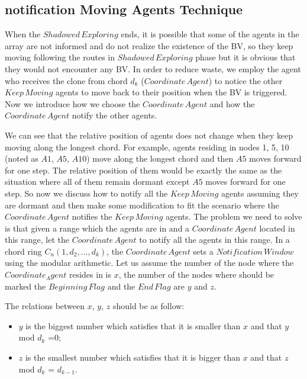 \subsection{notification Moving Agents Technique}


When the $Shadowed\,Exploring$ ends, it is possible that some of the agents in the array are not informed and do not realize the existence of the BV, so they keep moving following the routes in $Shadowed\,Exploring$  phase but it is obvious that they would not encounter any BV. In order to reduce waste, we employ the agent who receives the clone from chord $d_k$ ($Coordinate\,Agent$) to notice the other $Keep\,Moving$ agents to move back to their position when the BV is triggered. Now we introduce how we choose the $Coordinate\,Agent$ and how the $Coordinate\,Agent$ notify the other agents.



We can see that the relative position of agents does not change when they keep moving along the longest chord. For example, agents residing in nodes 1, 5, 10 (noted as $A1$, $A5$, $A10$) move along the longest chord and then $A5$ moves forward for one step. The relative position of them would be exactly the same as the situation where all of them remain dormant except $A5$ moves forward for one step. So now we discuss how to notify all the $Keep\,Moving$ agents assuming they are dormant and then make some modification to fit the scenario where the $Coordinate\,Agent$ notifies the $Keep\,Moving$ agents. The problem we need to solve is that given a range which the agents are in and a $Coordinate\,Agent$ located in this range, let the $Coordinate\,Agent$ to notify all the agents in this range. In a chord ring $C_n(1, d_2, \ldots, d_k)$, the $Coordinate\,Agent$ sets a $Notification\,Window$ using the modular arithmetic. Let us assume the number of the node where the $Coordinate_Agent$ resides in is $x$, the number of the nodes where should be marked the $Beginning\,Flag$ and the $End\,Flag$ are $y$ and $z$. 

The relations between $x$, $y$, $z$ should be as follow: 

\begin{itemize}
\item $y$ is the biggest number which satisfies that it is smaller than $x$ and that $y$ mod $d_k$ =$0$; 
\item $z$ is the smallest number which satisfies that it is bigger than $x$ and that $z$ mod $d_k$ = $d_{k-1}$.
\end{itemize} 

